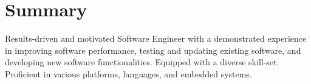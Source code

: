 
\section{Summary}

Results-driven and motivated Software Engineer with a demonstrated experience in improving software performance, testing and updating existing software, and developing new software functionalities.
Equipped with a diverse skill-set. Proficient in various platforms, languages, and embedded systems.
